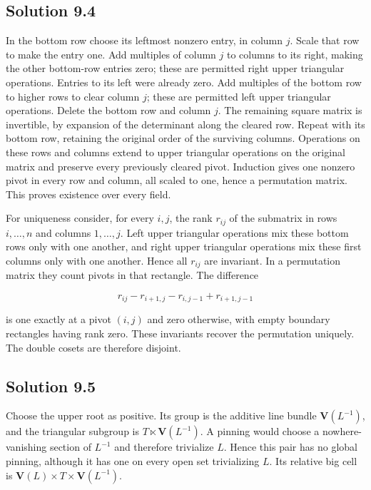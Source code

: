 \documentclass[11pt,a4paper,openany]{report}
\begin{document}
\subsection{Solution 9.4}\label{AG-RG-04-solution-9.4}

In the bottom row choose its leftmost nonzero entry, in column \(j\). Scale that row to make the entry one. Add multiples of column \(j\) to columns to its right, making the other bottom-row entries zero; these are permitted right upper triangular operations. Entries to its left were already zero. Add multiples of the bottom row to higher rows to clear column \(j\); these are permitted left upper triangular operations. Delete the bottom row and column \(j\). The remaining square matrix is invertible, by expansion of the determinant along the cleared row. Repeat with its bottom row, retaining the original order of the surviving columns. Operations on these rows and columns extend to upper triangular operations on the original matrix and preserve every previously cleared pivot. Induction gives one nonzero pivot in every row and column, all scaled to one, hence a permutation matrix. This proves existence over every field.

For uniqueness consider, for every \(i,j\), the rank \(r_{ij}\) of the submatrix in rows \(i,\ldots,n\) and columns \(1,\ldots,j\). Left upper triangular operations mix these bottom rows only with one another, and right upper triangular operations mix these first columns only with one another. Hence all \(r_{ij}\) are invariant. In a permutation matrix they count pivots in that rectangle. The difference

\[
r_{ij}-r_{i+1,j}-r_{i,j-1}+r_{i+1,j-1}
\]

is one exactly at a pivot \((i,j)\) and zero otherwise, with empty boundary rectangles having rank zero. These invariants recover the permutation uniquely. The double cosets are therefore disjoint.

\subsection{Solution 9.5}\label{AG-RG-04-solution-9.5}

Choose the upper root as positive. Its group is the additive line bundle \(\mathbf V(L^{-1})\), and the triangular subgroup is \(T\ltimes\mathbf V(L^{-1})\). A pinning would choose a nowhere-vanishing section of \(L^{-1}\) and therefore trivialize \(L\). Hence this pair has no global pinning, although it has one on every open set trivializing \(L\). Its relative big cell is \(\mathbf V(L)\times T\times\mathbf V(L^{-1})\).
\end{document}

